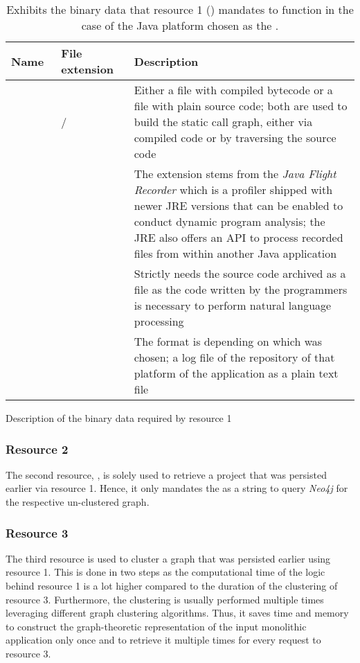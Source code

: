 \documentclass[12pt,a4paper]{report}
\begin{document}
\begin{table}[ht!]
\smaller
\def\arraystretch{1.55}
\begin{tabularx}{\textwidth}{|Y|Y|Y|}
 \hline
 Name~ & File extension~ & Description~ \\
 \hline\hline
          &  /  &
 Either a  file with compiled bytecode or a  file with plain source code;
 both are used to build the static call graph, either via compiled code or by traversing the source code \\\hline
         &  &
 The  extension stems from the \textit{Java Flight Recorder} which is a profiler shipped with newer
 JRE versions that can be enabled to conduct dynamic program analysis; the JRE also offers an API to process
 recorded  files from within another Java application \\\hline
        &  &
 Strictly needs the source code archived as a  file as the code written by the programmers
 is necessary to perform natural language processing \\\hline
    &  &
 The format is depending on which  was chosen; a log file of the repository of that platform
 of the application as a plain text file \\\hline
\end{tabularx}
\caption{Description of the binary data required by resource 1}
\caption*{
  Exhibits the binary data that resource 1 () mandates to function
  in the case of the Java platform chosen as the .
}
\label{table:binary-data-resource-1}
\end{table}


\subsubsection{Resource 2}
The second resource, , is solely used to retrieve a project
that was persisted earlier via resource 1. Hence, it only mandates the  as a string
to query \textit{Neo4j} for the respective un-clustered graph.


\subsubsection{Resource 3}
The third resource is used to cluster a graph that was persisted earlier using resource 1.
This is done in two steps as the computational time of the logic behind resource 1 is a lot higher
compared to the duration of the clustering of resource 3.
Furthermore, the clustering is usually performed multiple times leveraging different graph clustering
algorithms. Thus, it saves time and memory to construct the graph-theoretic representation of the
input monolithic application only once and to retrieve it multiple times for every request to resource 3.
\end{document}
